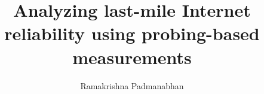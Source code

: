 \documentclass[10pt,onecolumn]{article}
\title{Analyzing last-mile Internet reliability using probing-based measurements}
\author{Ramakrishna Padmanabhan}
\begin{document}
\newcommand{\bb}{~~~~~}
\newcommand{\hdr}[1]{\multicolumn{1}{c}{\textbf{#1}}}
\newcommand\Tstrut{\rule{0pt}{2.2ex}}         %
\newcommand\Bstrut{\rule[-0.9ex]{0pt}{0pt}}   %

\maketitle










\clearpage %


\end{document}
